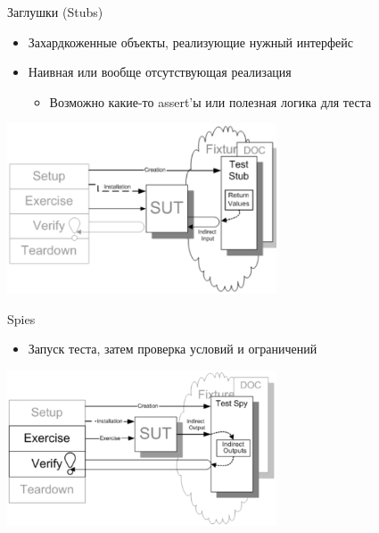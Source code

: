 \documentclass{../../slides-style}
\begin{document}
    \begin{frame}{Заглушки (Stubs)}
        \begin{itemize}
            \item Захардкоженные объекты, реализующие нужный интерфейс
            \item Наивная или вообще отсутствующая реализация
            \begin{itemize}
                \item Возможно какие-то assert’ы или полезная логика для теста
            \end{itemize}
        \end{itemize}
        \begin{center}
            \includegraphics[width=0.6\textwidth]{stub.png}
        \end{center}
    \end{frame}

    \begin{frame}{Spies}
        \begin{itemize}
            \item Запуск теста, затем проверка условий и ограничений
        \end{itemize}
        \begin{center}
            \includegraphics[width=0.6\textwidth]{spy.png}
        \end{center}
    \end{frame}
\end{document}

